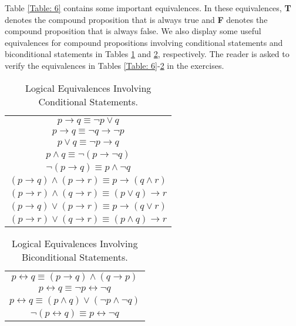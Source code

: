 \documentclass{Axon}
\begin{document}
Table \ref{Table: 6} contains some important equivalences. In these equivalences, \textbf{T} denotes the compound proposition that is always true and \textbf{F} denotes the compound proposition that is always false. We also display some useful equivalences for compound propositions involving conditional statements and biconditional statements in Tables \ref{Table: 7} and \ref{Table: 8}, respectively. The reader is asked to verify the equivalences in Tables \ref{Table: 6}-\ref{Table: 8} in the exercises.

\begin{table}[ht]
    \centering
    \begin{tabular}{c}
        \(p \to q \equiv \lnot p \lor q\)                      \\
        \(p \to q \equiv \lnot q \to \lnot p\)                 \\
        \(p \lor q \equiv \lnot p \to q\)                      \\
        \(p \land q \equiv \lnot (p \to \lnot q)\)             \\
        \(\lnot (p \to q) \equiv p \land \lnot q\)             \\
        \((p \to q) \land (p \to r) \equiv p \to (q \land r)\) \\
        \((p \to r) \land (q \to r) \equiv (p \lor q) \to r\)  \\
        \((p \to q) \lor (p \to r) \equiv p \to (q \lor r)\)   \\
        \((p \to r) \lor (q \to r) \equiv (p \land q) \to r\)
    \end{tabular}
    \caption{Logical Equivalences Involving Conditional Statements.}
    \label{Table: 7}
\end{table}

\begin{table}[ht]
    \centering
    \begin{tabular}{c}
        \(p \leftrightarrow q \equiv (p \to q) \land (q \to p)\)                \\
        \(p \leftrightarrow q \equiv \lnot p \leftrightarrow \lnot q\)          \\
        \(p \leftrightarrow q \equiv (p \land q) \lor (\lnot p \land \lnot q)\) \\
        \(\lnot (p \leftrightarrow q) \equiv p \leftrightarrow \lnot q\)
    \end{tabular}
    \caption{Logical Equivalences Involving Biconditional Statements.}
    \label{Table: 8}
\end{table}
\end{document}

